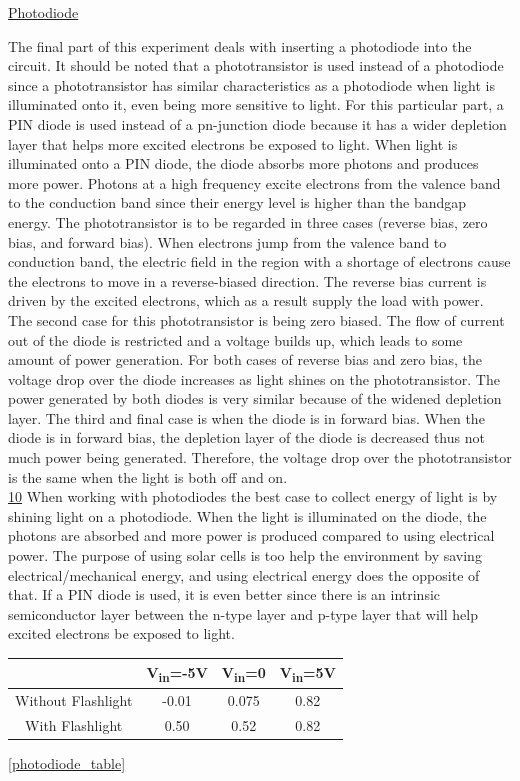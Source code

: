 \underline{Photodiode}

The final part of this experiment deals with inserting a photodiode into the circuit. It should be noted that a phototransistor is used instead of a photodiode since a  phototransistor has similar characteristics as a photodiode when light is illuminated onto it, even being more sensitive to light. For this particular part, a PIN diode is used instead of a pn-junction diode because it has a wider depletion layer that helps more excited electrons be exposed to light. When light is illuminated onto a PIN diode, the diode absorbs more photons and produces more power. Photons at a high frequency excite electrons from the valence band to the conduction band since their energy level is higher than the bandgap energy. The phototransistor is to be regarded in three cases (reverse bias, zero bias, and forward bias). When electrons jump from the valence band to conduction band, the electric field in the region with a shortage of electrons cause the electrons to move in a reverse-biased direction. The reverse bias current is driven by the excited electrons, which as a result supply the load with power. The second case for this phototransistor is being zero biased. The flow of current out of the diode is restricted and a voltage builds up, which leads to some amount of power generation. For both cases of reverse bias and zero bias, the voltage drop over the diode increases as light shines on the phototransistor. The power generated by both diodes is very similar because of the widened depletion layer. The third and final case is when the diode is in forward bias. When the diode is in forward bias, the depletion layer of the diode is decreased thus not much power being generated. Therefore, the voltage drop over the phototransistor is the same when the light is both off and on. \\



\underline{10}
When working with photodiodes the best case to collect energy of light is by shining light on a photodiode. When the light is illuminated on the diode, the photons are absorbed and more power is produced compared to using electrical power. The purpose of using solar cells is too help the environment by saving electrical/mechanical energy, and using electrical energy does the opposite of that. If a PIN diode is used, it is even better since there is an intrinsic semiconductor layer between the n-type layer and p-type layer that will help excited electrons be exposed to light. \\
\begin{table}
	\centering
	\begin{tabular}{| c | c | c | c |}\hline
		& V\textsubscript{in}=-5V & V\textsubscript{in}=0 & V\textsubscript{in}=5V \\\hline
		Without Flashlight & -0.01 & 0.075 & 0.82\\\hline
		With Flashlight & 0.50 & 0.52 & 0.82 \\\hline
	\end{tabular}
\label{Voltage over Photodiode}
\ref{photodiode_table}
\end{table}

